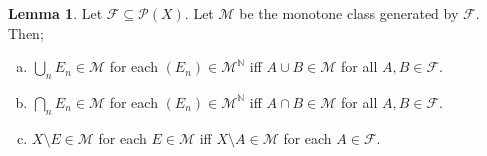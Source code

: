 \documentclass{article}
\newcommand{\N}{\mathbb{N}}
\theoremstyle{definition}
\newtheorem{lemma}[theorem]{Lemma}
\begin{document}
\begin{lemma}
    Let $\mathscr{F} \subseteq \mathcal{P}(X)$. Let $\mathscr{M}$ be the monotone class generated by $\mathscr{F}$. Then;
    
    \begin{enumerate}[(a)]
        \item $\bigcup_n E_n \in \mathscr{M}$ for each $(E_n) \in \mathscr{M}^{\N}$ iff $A \cup B \in \mathscr{M}$ for all $A,B \in \mathscr{F}$.
        \item $\bigcap_n E_n \in \mathscr{M}$ for each $(E_n) \in \mathscr{M}^{\N}$ iff $A \cap B \in \mathscr{M}$ for all $A,B \in \mathscr{F}$.
        \item $X\setminus E \in \mathscr{M}$ for each $E \in \mathscr{M}$ iff $X\setminus A \in \mathscr{M}$ for each $A \in \mathscr{F}$.
    \end{enumerate}
\end{lemma}
\end{document}
